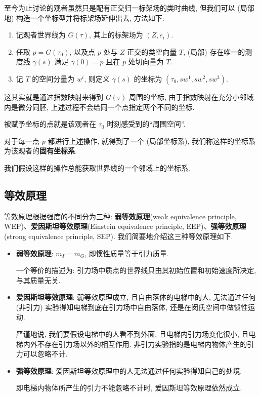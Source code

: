 至今为止讨论的观者虽然只是配有正交归一标架场的类时曲线, 但我们可以 (局部地) 构造一个坐标型并将标架场延伸出去, 方法如下:
\begin{enumerate}
	\item 记观者世界线为 $G(\tau)$, 其上的标架场为 $(Z,e_i)$.
	\item 任取 $p=G(\tau_0)$, 以及点 $p$ 处与 $Z$ 正交的类空向量 $T$, (局部) 存在唯一的测度线 $\gamma(s)$ 满足 $\gamma(0)=p$ 且在 $p$ 处切向量为 $T$.
	\item 记 $T$ 的空间分量为 $w^i$, 则定义 $\gamma(s)$ 的坐标为 $(\tau_0,sw^1,sw^2,sw^3)$.
\end{enumerate}
\begin{remark}
	这其实就是通过指数映射来得到 $G(\tau)$ 周围的坐标, 由于指数映射在充分小邻域内是微分同胚, 上述过程不会给同一个点指定两个不同的坐标. 
\end{remark}
\begin{remark}
	被赋予坐标的点就是该观者在 $\tau_0$ 时刻感受到的``周围空间''.
\end{remark}
对于每一点 $p$ 都进行上述操作, 就得到了一个 (局部坐标系), 我们称这样的坐标系为该观者的{\bf 固有坐标系}.
\begin{remark}
	我们假设这样的操作总能获取世界线的一个邻域上的坐标系.
\end{remark}
\subsection{等效原理}
等效原理根据强度的不同分为三种: {\bf 弱等效原理}(weak equivalence principle, WEP)、{\bf 爱因斯坦等效原理}(Einstein equivalence principle, EEP)、{\bf 强等效原理}(strong equivalence principle, SEP). 我们简要地介绍这三种等效原理如下.
\begin{itemize}
	\item {\bf 弱等效原理}: $m_I=m_G$, 即惯性质量等于引力质量.
	\begin{remark}
		一个等价的描述为: 引力场中质点的世界线只由其初始位置和初始速度所决定, 与其质量无关.
	\end{remark}
	\item {\bf 爱因斯坦等效原理}: 弱等效原理成立, 且自由落体的电梯中的人, 无法通过任何 (非引力) 实验得知电梯到底在引力场中自由落体, 还是在闵氏空间中做惯性运动.
	\begin{remark}
		严谨地说, 我们要假设电梯中的人看不到外面, 且电梯内引力场变化很小, 且电梯内外不存在引力场以外的相互作用. 非引力实验指的是电梯内物体产生的引力可以忽略不计.
	\end{remark}
	\item {\bf 强等效原理}: 爱因斯坦等效原理中的人无法通过任何实验得知自己的处境.
	\begin{remark}
		即电梯内物体所产生的引力不能忽略不计时, 爱因斯坦等效原理依然成立.
	\end{remark}
\end{itemize}

